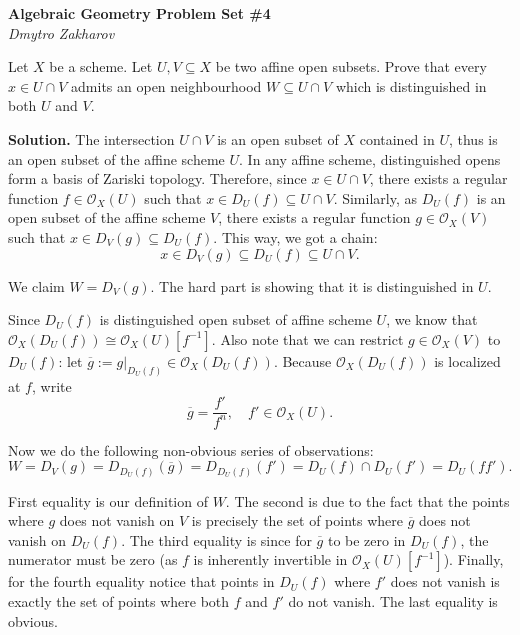 \documentclass{template}
\begin{document}
\begin{center}
    \Large \textcolor{blue!70!black}{\textbf{Algebraic Geometry Problem Set \#4}} \\
    \normalsize \textit{Dmytro Zakharov}
\end{center}

\begin{problem}[Exercise 1]
    Let $X$ be a scheme. Let $U,V \subseteq X$ be two affine open subsets.
    Prove that every $x \in U \cap V$ admits an open neighbourhood $W \subseteq U \cap V$
    which is distinguished in both $U$ and $V$.
\end{problem}

\textbf{Solution.} The intersection $U \cap V$ is an open subset of $X$
contained in $U$, thus is an open subset of the affine scheme $U$.
In any affine scheme, distinguished opens form a basis of Zariski topology.
Therefore, since $x \in U \cap V$, there exists a regular function 
$f \in \mathcal{O}_X(U)$ such that $x \in D_U(f) \subseteq U \cap V$.
Similarly, as $D_U(f)$ is an open subset of the affine scheme $V$,
there exists a regular function $g \in \mathcal{O}_X(V)$ such that 
$x \in D_V(g) \subseteq D_U(f)$. This way, we got a chain:
\begin{equation*}
    x \in D_V(g) \subseteq D_U(f) \subseteq U \cap V.
\end{equation*}

We claim $W = D_V(g)$. The hard part is showing that it is distinguished in $U$.

Since $D_U(f)$ is distinguished open subset of affine scheme $U$, we know that
$\mathcal{O}_X(D_U(f)) \cong \mathcal{O}_X(U)[f^{-1}]$. Also note that we can
restrict $g \in \mathcal{O}_X(V)$ to $D_U(f)$: let $\overline{g} := g|_{D_U(f)}
\in \mathcal{O}_X(D_U(f))$. Because $\mathcal{O}_X(D_U(f))$ is localized at $f$, write
\begin{equation*}
    \overline{g} = \frac{f'}{f^n}, \quad f' \in \mathcal{O}_X(U).
\end{equation*}

Now we do the following non-obvious series of observations:
\begin{equation*}
    W = D_V(g) = D_{D_U(f)}(\overline{g}) = D_{D_U(f)}(f') = D_U(f) \cap D_U(f') = D_U(ff').
\end{equation*}

First equality is our definition of $W$. The second is due to the fact 
that the points where $g$ does not vanish on $V$ is precisely the set of points
where $\overline{g}$ does not vanish on $D_U(f)$. The third equality is 
since for $\overline{g}$ to be zero in $D_U(f)$, the numerator must be zero 
(as $f$ is inherently invertible in $\mathcal{O}_X(U)[f^{-1}]$). 
Finally, for the fourth equality notice that points in $D_U(f)$ where $f'$ does 
not vanish is exactly the set of points where both $f$ and $f'$ do not vanish.
The last equality is obvious.
\end{document}
